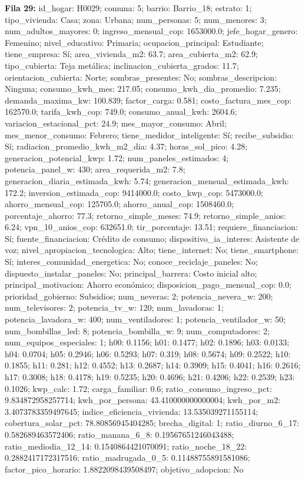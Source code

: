 {\footnotesize\textbf{Fila 29:} id\_hogar: H0029; comuna: 5; barrio: Barrio\_18; estrato: 1; tipo\_vivienda: Casa; zona: Urbana; num\_personas: 5; num\_menores: 3; num\_adultos\_mayores: 0; ingreso\_mensual\_cop: 1653000.0; jefe\_hogar\_genero: Femenino; nivel\_educativo: Primaria; ocupacion\_principal: Estudiante; tiene\_empresa: Sí; area\_vivienda\_m2: 63.7; area\_cubierta\_m2: 62.9; tipo\_cubierta: Teja metálica; inclinacion\_cubierta\_grados: 11.7; orientacion\_cubierta: Norte; sombras\_presentes: No; sombras\_descripcion: Ninguna; consumo\_kwh\_mes: 217.05; consumo\_kwh\_dia\_promedio: 7.235; demanda\_maxima\_kw: 100.839; factor\_carga: 0.581; costo\_factura\_mes\_cop: 162570.0; tarifa\_kwh\_cop: 749.0; consumo\_anual\_kwh: 2604.6; variacion\_estacional\_pct: 24.9; mes\_mayor\_consumo: Abril; mes\_menor\_consumo: Febrero; tiene\_medidor\_inteligente: Sí; recibe\_subsidio: Sí; radiacion\_promedio\_kwh\_m2\_dia: 4.37; horas\_sol\_pico: 4.28; generacion\_potencial\_kwp: 1.72; num\_paneles\_estimados: 4; potencia\_panel\_w: 430; area\_requerida\_m2: 7.8; generacion\_diaria\_estimada\_kwh: 5.74; generacion\_mensual\_estimada\_kwh: 172.2; inversion\_estimada\_cop: 9414000.0; costo\_kwp\_cop: 5473000.0; ahorro\_mensual\_cop: 125705.0; ahorro\_anual\_cop: 1508460.0; porcentaje\_ahorro: 77.3; retorno\_simple\_meses: 74.9; retorno\_simple\_anios: 6.24; vpn\_10\_anios\_cop: 632651.0; tir\_porcentaje: 13.51; requiere\_financiacion: Sí; fuente\_financiacion: Crédito de consumo; dispositivo\_ia\_interes: Asistente de voz; nivel\_apropiacion\_tecnologica: Alto; tiene\_internet: No; tiene\_smartphone: Sí; interes\_comunidad\_energetica: No; conoce\_reciclaje\_paneles: No; dispuesto\_instalar\_paneles: No; principal\_barrera: Costo inicial alto; principal\_motivacion: Ahorro económico; disposicion\_pago\_mensual\_cop: 0.0; prioridad\_gobierno: Subsidios; num\_neveras: 2; potencia\_nevera\_w: 200; num\_televisores: 2; potencia\_tv\_w: 120; num\_lavadoras: 1; potencia\_lavadora\_w: 400; num\_ventiladores: 1; potencia\_ventilador\_w: 50; num\_bombillas\_led: 8; potencia\_bombilla\_w: 9; num\_computadores: 2; num\_equipos\_especiales: 1; h00: 0.1156; h01: 0.1477; h02: 0.1896; h03: 0.0133; h04: 0.0704; h05: 0.2946; h06: 0.5293; h07: 0.319; h08: 0.5674; h09: 0.2522; h10: 0.1855; h11: 0.281; h12: 0.4552; h13: 0.2687; h14: 0.3909; h15: 0.4041; h16: 0.2616; h17: 0.3008; h18: 0.4178; h19: 0.5235; h20: 0.4696; h21: 0.4206; h22: 0.2539; h23: 0.1026; kwp\_calc: 1.72; carga\_familiar: 0.6; ratio\_consumo\_ingreso\_pct: 9.834872958257714; kwh\_por\_persona: 43.410000000000004; kwh\_por\_m2: 3.4073783359497645; indice\_eficiencia\_vivienda: 13.535039271155114; cobertura\_solar\_pct: 78.80856945404285; brecha\_digital: 1; ratio\_diurno\_6\_17: 0.582689463572406; ratio\_manana\_6\_8: 0.19567651246043488; ratio\_mediodia\_12\_14: 0.1540864421070091; ratio\_noche\_18\_22: 0.2882417172317516; ratio\_madrugada\_0\_5: 0.11488755891581086; factor\_pico\_horario: 1.8822098439508497; objetivo\_adopcion: No\par}
